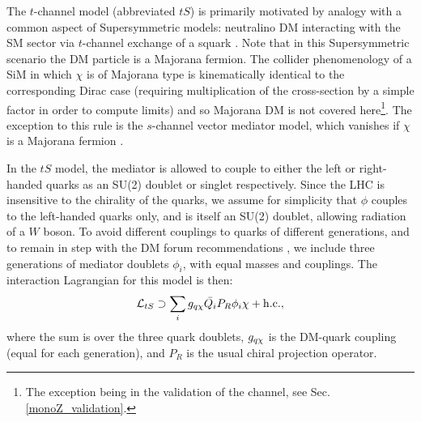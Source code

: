 
The $t$-channel model (abbreviated $tS$) is primarily 
motivated by analogy with a common aspect of Supersymmetric models: neutralino DM interacting with the SM sector via $t$-channel exchange of a squark \cite{SUSYDM}. Note that in this Supersymmetric scenario the DM particle is a Majorana fermion. The collider phenomenology of a SiM in which $\chi$ is of Majorana type is kinematically identical to the corresponding Dirac case (requiring multiplication of the cross-section by a simple factor in order to compute limits) and so Majorana DM is not covered here\footnote{The exception being in the validation of the \monoZ channel, see Sec. \ref{monoZ_validation}.}. The exception to this rule is the $s$-channel vector mediator model, which vanishes if $\chi$ is a Majorana fermion \cite{METSig}.

In the $tS$ model, the mediator is allowed to couple to either the left or right-handed quarks as an SU(2) doublet or singlet respectively. Since the LHC is insensitive to the chirality of the quarks, we assume for simplicity that $\phi$ couples to the left-handed quarks only, and is itself an SU(2) doublet, allowing radiation of a $W$ boson. To avoid different couplings to quarks of different generations, and to remain in step with the DM forum recommendations \cite{DMForumReport}, we include three generations of mediator doublets $\phi_i$, with equal masses and couplings. The interaction Lagrangian for this model is then:
\begin{equation}
\label{L_int_tS}
\mathcal{L}_{tS} \supset \sum_{i} g_{q \chi} \bar{Q_i} P_R \phi_i \chi + {\rm h.c.},
\end{equation}
where the sum is over the three quark doublets, $g_{q \chi}$ is the DM-quark coupling (equal for each generation), and $P_R$ is the usual chiral projection operator. 

